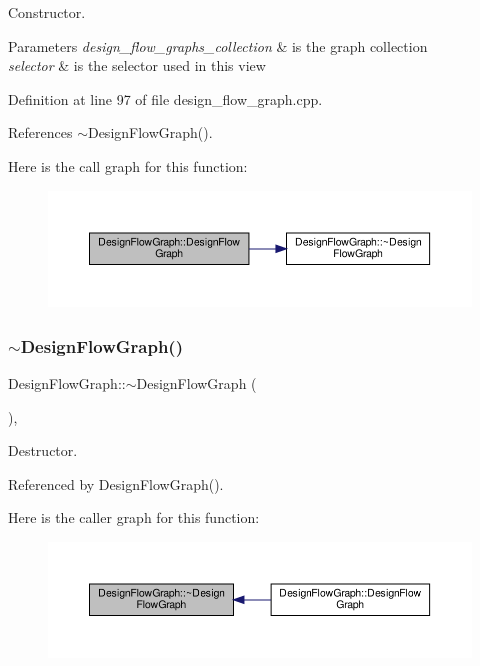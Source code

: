 Constructor. 


\begin{DoxyParams}{Parameters}
{\em design\+\_\+flow\+\_\+graphs\+\_\+collection} & is the graph collection \\
\hline
{\em selector} & is the selector used in this view \\
\hline
\end{DoxyParams}


Definition at line 97 of file design\+\_\+flow\+\_\+graph.\+cpp.



References $\sim$\+Design\+Flow\+Graph().

Here is the call graph for this function\+:
\nopagebreak
\begin{figure}[H]
\begin{center}
\leavevmode
\includegraphics[width=350pt]{de/de0/classDesignFlowGraph_aa3ce6a9558465018fbdd33a5164677fe_cgraph}
\end{center}
\end{figure}
\mbox{\label{classDesignFlowGraph_a1e2ca220f342258249f328f0d59417c6}} 
\subsubsection{\texorpdfstring{$\sim$\+Design\+Flow\+Graph()}{~DesignFlowGraph()}}
{\footnotesize\ttfamily Design\+Flow\+Graph\+::$\sim$\+Design\+Flow\+Graph (\begin{DoxyParamCaption}{ }\end{DoxyParamCaption})\hspace{0.3cm}{\ttfamily [override]}, {\ttfamily [default]}}



Destructor. 



Referenced by Design\+Flow\+Graph().

Here is the caller graph for this function\+:
\nopagebreak
\begin{figure}[H]
\begin{center}
\leavevmode
\includegraphics[width=350pt]{de/de0/classDesignFlowGraph_a1e2ca220f342258249f328f0d59417c6_icgraph}
\end{center}
\end{figure}



